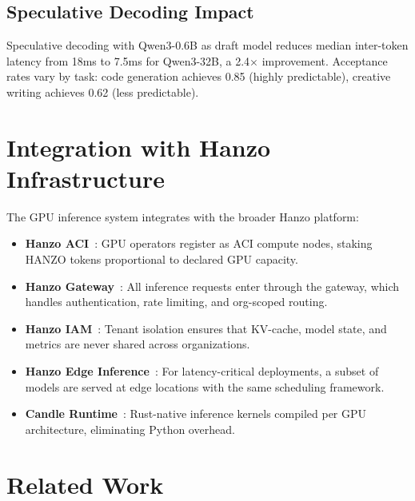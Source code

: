 \documentclass[11pt]{article}
\begin{document}
\subsection{Speculative Decoding Impact}

Speculative decoding with Qwen3-0.6B as draft model reduces median inter-token
latency from 18ms to 7.5ms for Qwen3-32B, a 2.4$\times$ improvement.
Acceptance rates vary by task: code generation achieves 0.85 (highly
predictable), creative writing achieves 0.62 (less predictable).

\section{Integration with Hanzo Infrastructure}
\label{sec:integration}

The GPU inference system integrates with the broader Hanzo platform:
\begin{itemize}[leftmargin=1.1em]
    \item \textbf{Hanzo ACI}~\cite{hanzoaci}: GPU operators register as ACI
    compute nodes, staking HANZO tokens proportional to declared GPU capacity.
    \item \textbf{Hanzo Gateway}~\cite{hanzogateway}: All inference requests
    enter through the gateway, which handles authentication, rate limiting, and
    org-scoped routing.
    \item \textbf{Hanzo IAM}~\cite{hanzoiam}: Tenant isolation ensures that
    KV-cache, model state, and metrics are never shared across organizations.
    \item \textbf{Hanzo Edge Inference}~\cite{hanzoedge}: For latency-critical
    deployments, a subset of models are served at edge locations with the same
    scheduling framework.
    \item \textbf{Candle Runtime}~\cite{hanzocandle}: Rust-native inference
    kernels compiled per GPU architecture, eliminating Python overhead.
\end{itemize}

\section{Related Work}
\label{sec:related}
\end{document}
